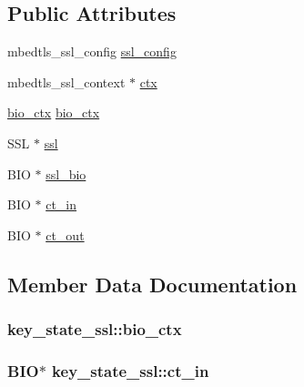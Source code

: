 \subsection*{Public Attributes}
\begin{DoxyCompactItemize}
\item 
mbedtls\+\_\+ssl\+\_\+config \hyperlink{structkey__state__ssl_af07b31e4dab76acec3ea7420e66a3bf2}{ssl\+\_\+config}
\item 
mbedtls\+\_\+ssl\+\_\+context $\ast$ \hyperlink{structkey__state__ssl_aa9227f00c4139a321564b3ba1e7e4f93}{ctx}
\item 
\hyperlink{structbio__ctx}{bio\+\_\+ctx} \hyperlink{structkey__state__ssl_ae5fa226c971d80a2a51eb4571651ef50}{bio\+\_\+ctx}
\item 
S\+S\+L $\ast$ \hyperlink{structkey__state__ssl_a57b7d5c0e8e97b59ce9cdb84e13e547f}{ssl}
\item 
B\+I\+O $\ast$ \hyperlink{structkey__state__ssl_a8f5a44beeee25a840aeb7066f3f67872}{ssl\+\_\+bio}
\item 
B\+I\+O $\ast$ \hyperlink{structkey__state__ssl_a53c8f98bd4ab57d8a84cff856b06bccd}{ct\+\_\+in}
\item 
B\+I\+O $\ast$ \hyperlink{structkey__state__ssl_aaeae666ec95965ee25625664e2963618}{ct\+\_\+out}
\end{DoxyCompactItemize}


\subsection{Member Data Documentation}
\hypertarget{structkey__state__ssl_ae5fa226c971d80a2a51eb4571651ef50}{}
\subsubsection[{bio\+\_\+ctx}]{ key\+\_\+state\+\_\+ssl\+::bio\+\_\+ctx}\label{structkey__state__ssl_ae5fa226c971d80a2a51eb4571651ef50}
\hypertarget{structkey__state__ssl_a53c8f98bd4ab57d8a84cff856b06bccd}{}
\subsubsection[{ct\+\_\+in}]{\setlength{\rightskip}{0pt plus 5cm}B\+I\+O$\ast$ key\+\_\+state\+\_\+ssl\+::ct\+\_\+in}\label{structkey__state__ssl_a53c8f98bd4ab57d8a84cff856b06bccd}
\hypertarget{structkey__state__ssl_aaeae666ec95965ee25625664e2963618}{}
